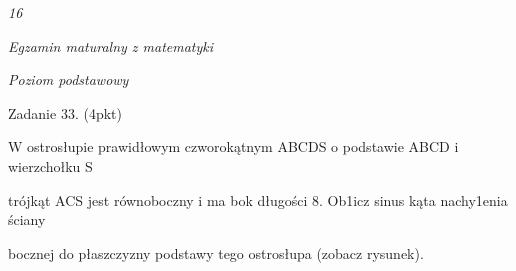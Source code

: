 \documentclass[a4paper,12pt]{article}
\begin{document}
{\it 16}

{\it Egzamin maturalny z matematyki}

{\it Poziom podstawowy}

Zadanie 33. (4pkt)

W ostrosłupie prawidłowym czworokątnym ABCDS o podstawie ABCD i wierzchołku S

trójkąt ACS jest równoboczny i ma bok długości 8. Ob1icz sinus kąta nachy1enia ściany

bocznej do płaszczyzny podstawy tego ostrosłupa (zobacz rysunek).
\end{document}
